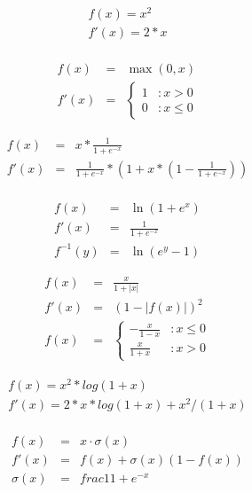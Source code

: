 \documentclass{article}
\begin{document}
\begin{eqnarray*} f(x) = x^2 \\ f'(x) = 2 * x \\ \end{eqnarray*}
\pagebreak

\begin{eqnarray*} f(x) &=& \max(0, x) \\ f'(x) &=& \left\{ \begin{array}{lr} 1 & : x > 0 \\ 0 & : x \le 0 \end{array} \right. \end{eqnarray*}
\pagebreak

\begin{eqnarray*} f(x) &=& x * \frac{1}{1 + e^{-x}}\\ f'(x) &=& \frac{1}{1 + e^{-x}} * (1 + x * (1-\frac{1}{1 + e^{-x}}))\\ \end{eqnarray*}
\pagebreak

\begin{eqnarray*} f(x) &=& \ln(1 + e^{x}) \\ f'(x) &=& \frac{1}{1 + e^{-x}} \\ f^{-1}(y) &=& \ln(e^{y} - 1) \end{eqnarray*}
\pagebreak

\begin{eqnarray*} f(x) &=& \frac{x}{1 + |x|} \\ f'(x) &=& (1 - |f(x)|)^2 \\ f(x) &=& \left\{ \begin{array}{lr} -\frac{x}{1 - x} & : x \le 0 \\ \frac{x}{1 + x} & : x > 0 \end{array} \right. \end{eqnarray*}
\pagebreak

\begin{eqnarray*} f(x) = x^2 * log(1 + x) \\ f'(x) = 2 * x * log(1 + x) + x^2 / (1 + x)\\ \end{eqnarray*}
\pagebreak

\begin{eqnarray*} f(x) &=& x \cdot \sigma(x) \\ f'(x) &=& f(x) + \sigma(x) (1 - f(x)) \\ \sigma(x) &=& frac{1}{1 + e^{-x}} \end{eqnarray*}
\pagebreak
\end{document}

